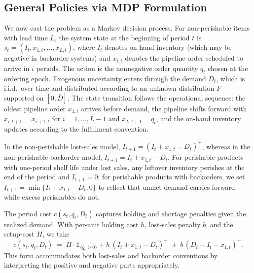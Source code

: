 \subsection{General Policies via MDP Formulation}
We now cast the problem as a Markov decision process. For non-perishable items with lead time $L$, the system state at the beginning of period $t$ is $s_t = (I_t, x_{1,t}, \ldots, x_{L,t})$, where $I_t$ denotes on-hand inventory (which may be negative in backorder systems) and $x_{i,t}$ denotes the pipeline order scheduled to arrive in $i$ periods. The action is the nonnegative order quantity $q_t$ chosen at the ordering epoch. Exogenous uncertainty enters through the demand $D_t$, which is i.i.d.\ over time and distributed according to an unknown distribution $F$ supported on $[0, \bar{D}]$. The state transition follows the operational sequence: the oldest pipeline order $x_{1,t}$ arrives before demand, the pipeline shifts forward with $x_{i,t+1} = x_{i+1,t}$ for $i = 1, \ldots, L-1$ and $x_{L,t+1} = q_t$, and the on-hand inventory updates according to the fulfillment convention. 

In the non-perishable lost-sales model, $I_{t+1} = (I_t + x_{1,t} - D_t)^+$, whereas in the non-perishable backorder model, $I_{t+1} = I_t + x_{1,t} - D_t$. For perishable products with one-period shelf life under lost sales, any leftover inventory perishes at the end of the period and $I_{t+1} = 0$; for perishable products with backorders, we set $I_{t+1} = \min\{I_t + x_{1,t} - D_t, 0\}$ to reflect that unmet demand carries forward while excess perishables do not.

The period cost $c(s_t, q_t, D_t)$ captures holding and shortage penalties given the realized demand. With per-unit holding cost $h$, lost-sales penalty $b$, and the setup-cost $H$, we take
\[
c(s_t, q_t, D_t) \;=\; H\cdot \mathds{1}_{\{q_t>0\}} + h \, (I_t + x_{1,t} - D_t)^+ \;+\; b \, (D_t - I_t - x_{1,t})^+.
\]
This form accommodates both lost-sales and backorder conventions by interpreting the positive and negative parts appropriately.

